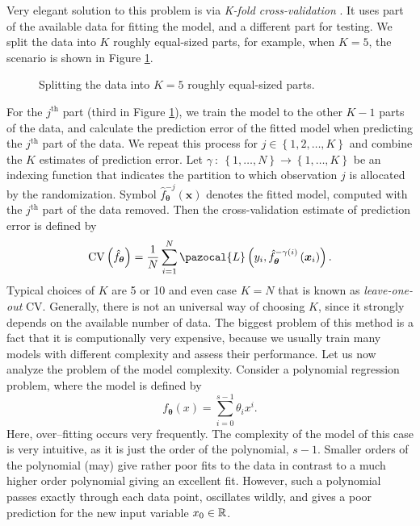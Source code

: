 Very elegant solution to this problem is via \emph{K-fold cross-validation} \cite{statistics}. It
uses part of the available data for fitting the model, and a different
part for testing. We split the data into $K$ roughly equal-sized parts, for
example, when $K = 5$, the scenario is shown in Figure \ref{fig:KFOLD}. 
\begin{figure}[h]
\begin{center}
\end{center}
\caption{Splitting the data into $K=5$ roughly equal-sized parts.}
\label{fig:KFOLD}
\end{figure}
For the $j^{\mathrm{th}}$ part (third in Figure \ref{fig:KFOLD}), we train the model to the other $K-1$ parts
of the data, and calculate the prediction error of the fitted model when
predicting the $j^{\mathrm{th}}$ part of the data. We repeat this process for $j \in \left\lbrace 1,2,\dots,K\right\rbrace$ and
combine the $K$ estimates of prediction error. Let $\gamma~:~\left\lbrace 1,\dots,N\right\rbrace\rightarrow  \left\lbrace 1,\dots,K\right\rbrace$ be an indexing
function that indicates the partition to which observation $j$ is allocated by
the randomization. Symbol $\hat{f}_{\boldsymbol{\theta}}^{-j}\left(\boldsymbol{x}\right)$ denotes the fitted model, computed with
the $j^{\mathrm{th}}$ part of the data removed. Then the cross-validation estimate of prediction error is defined by
\begin{equation}
\mathrm{CV}\left(\hat{f}_{\boldsymbol{\theta}}\right) = \frac{1}{N}\sum_{i = 1}^{N}\pazocal{L}\left(y_i , \hat{f}_{\boldsymbol{\theta}}^{-\gamma\left(i\right)}\left(\boldsymbol{x}_i\right)\right).
\end{equation}
Typical choices of $K$ are 5 or 10 and even case $K = N$ that is known as \emph{leave-one-out} CV. Generally, there is not an universal way of choosing $K$, since it strongly depends on the available number of data. 
The biggest problem of this method is a fact that it is computionally very expensive, because we usually train many models with different complexity and assess their performance. Let us now analyze the problem of the model complexity. Consider a polynomial regression problem,  where the model is defined by
\begin{equation}
	f_{\boldsymbol{\theta}}(x) = \sum_{i=0}^{s-1}\theta_ix^i.
\end{equation}
 Here, over--fitting occurs very frequently. The complexity of the model of this case is very intuitive, as it is just the order of the polynomial, $s-1$.  Smaller orders of the polynomial (may) give rather poor fits to the data in contrast to a much higher order polynomial giving an excellent fit. However, such a polynomial passes exactly through each data point, oscillates wildly, and gives a poor prediction for the new input variable $x_{0}\in \mathbb{R}$. 
 
